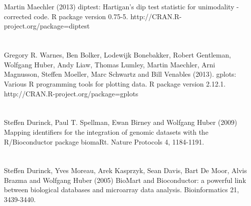 \documentclass{article}
\begin{document}
\paragraph{} \hspace{0pt} \\
  Martin Maechler (2013)
  diptest: Hartigan's dip test statistic for unimodality - corrected
  code. R package version 0.75-5.
  http://CRAN.R-project.org/package=diptest
\paragraph{} \hspace{0pt} \\
  Gregory R. Warnes, Ben Bolker, Lodewijk Bonebakker, Robert Gentleman,
  Wolfgang Huber, Andy Liaw, Thomas Lumley, Martin Maechler,
  Arni Magnusson, Steffen Moeller, Marc Schwartz and
  Bill Venables (2013).
  gplots: Various R programming tools for plotting data.
  R package version 2.12.1. http://CRAN.R-project.org/package=gplots
\paragraph{} \hspace{0pt} \\
  Steffen Durinck, Paul T. Spellman, Ewan Birney and Wolfgang Huber (2009)
  Mapping identifiers for the integration of genomic datasets
  with the R/Bioconductor package biomaRt.
  Nature Protocols 4, 1184-1191.
\paragraph{} \hspace{0pt} \\
  Steffen Durinck, Yves Moreau, Arek Kasprzyk, Sean Davis,
  Bart De Moor, Alvis Brazma and Wolfgang Huber (2005)
  BioMart and Bioconductor: a powerful link between biological databases
  and microarray data analysis.
  Bioinformatics 21, 3439-3440.
  
\end{document}
